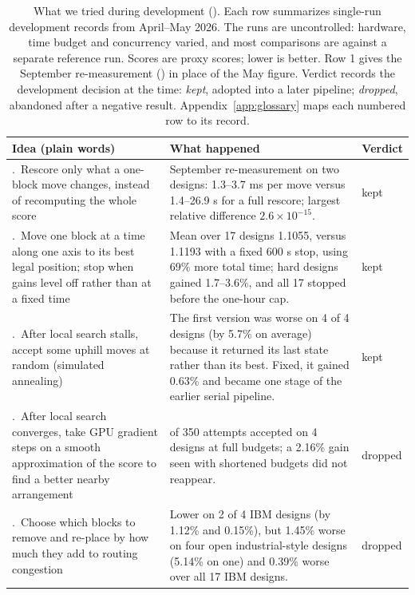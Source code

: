 \begin{table}[htbp]
\centering
\footnotesize
\caption{What we tried during development (\historical). Each row summarizes single-run development records from April--May 2026. The runs are uncontrolled: hardware, time budget and concurrency varied, and most comparisons are against a separate reference run. Scores are proxy scores; lower is better. Row 1 gives the September re-measurement (\measurement) in place of the May figure. Verdict records the development decision at the time: \emph{kept}, adopted into a later pipeline; \emph{dropped}, abandoned after a negative result. Appendix~\ref{app:glossary} maps each numbered row to its record.}
\label{tab:development}
\begin{tabularx}{\linewidth}{@{}>{\raggedright\arraybackslash\hsize=0.9\hsize}X>{\raggedright\arraybackslash\hsize=1.1\hsize}Xl@{}}
\toprule
Idea (plain words) & What happened & Verdict \\
\midrule
1.~Rescore only what a one-block move changes, instead of recomputing the whole score & September re-measurement on two designs: 1.3--3.7 ms per move versus 1.4--26.9 s for a full rescore; largest relative difference $2.6\times10^{-15}$. & kept \\
\addlinespace[2pt]
2.~Move one block at a time along one axis to its best legal position; stop when gains level off rather than at a fixed time & Mean over 17 designs 1.1055, versus 1.1193 with a fixed 600 s stop, using 69\% more total time; hard designs gained 1.7--3.6\%, and all 17 stopped before the one-hour cap. & kept \\
\addlinespace[2pt]
3.~After local search stalls, accept some uphill moves at random (simulated annealing) & The first version was worse on 4 of 4 designs (by 5.7\% on average) because it returned its last state rather than its best. Fixed, it gained 0.63\% and became one stage of the earlier serial pipeline. & kept \\
\addlinespace[2pt]
4.~After local search converges, take GPU gradient steps on a smooth approximation of the score to find a better nearby arrangement & 0 of 350 attempts accepted on 4 designs at full budgets; a 2.16\% gain seen with shortened budgets did not reappear. & dropped \\
\addlinespace[2pt]
5.~Choose which blocks to remove and re-place by how much they add to routing congestion & Lower on 2 of 4 IBM designs (by 1.12\% and 0.15\%), but 1.45\% worse on four open industrial-style designs (5.14\% on one) and 0.39\% worse over all 17 IBM designs. & dropped \\

\end{tabularx}
\end{table}
